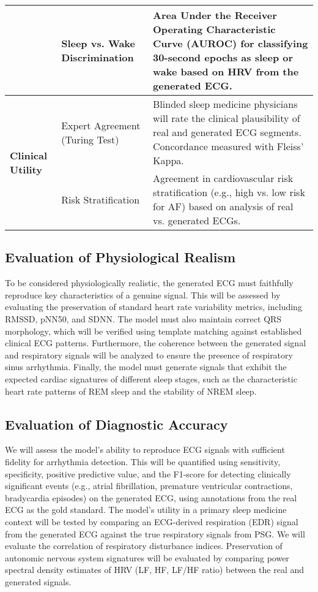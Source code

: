 \documentclass[11pt,en]{elegantpaper}
\begin{document}
\begin{table}[H]
\begin{tabular}{p{} p{} p{}}
        \cline{2-3}
        & Sleep vs. Wake Discrimination & Area Under the Receiver Operating Characteristic Curve (AUROC) for classifying 30-second epochs as sleep or wake based on HRV from the generated ECG. \\
        \midrule
        \multirow{2}{*}{\textbf{Clinical Utility}}
        & Expert Agreement (Turing Test) & Blinded sleep medicine physicians will rate the clinical plausibility of real and generated ECG segments. Concordance measured with Fleiss' Kappa. \\
        \cline{2-3}
        & Risk Stratification & Agreement in cardiovascular risk stratification (e.g., high vs. low risk for AF) based on analysis of real vs. generated ECGs. \\
        \bottomrule
    \end{tabular}
\end{table}

\subsection{Evaluation of Physiological Realism}
To be considered physiologically realistic, the generated ECG must faithfully reproduce key characteristics of a genuine signal. This will be assessed by evaluating the preservation of standard heart rate variability metrics, including RMSSD, pNN50, and SDNN. The model must also maintain correct QRS morphology, which will be verified using template matching against established clinical ECG patterns. Furthermore, the coherence between the generated signal and respiratory signals will be analyzed to ensure the presence of respiratory sinus arrhythmia. Finally, the model must generate signals that exhibit the expected cardiac signatures of different sleep stages, such as the characteristic heart rate patterns of REM sleep and the stability of NREM sleep.

\subsection{Evaluation of Diagnostic Accuracy}
We will assess the model's ability to reproduce ECG signals with sufficient fidelity for arrhythmia detection. This will be quantified using sensitivity, specificity, positive predictive value, and the F1-score for detecting clinically significant events (e.g., atrial fibrillation, premature ventricular contractions, bradycardia episodes) on the generated ECG, using annotations from the real ECG as the gold standard. The model's utility in a primary sleep medicine context will be tested by comparing an ECG-derived respiration (EDR) signal from the generated ECG against the true respiratory signals from PSG. We will evaluate the correlation of respiratory disturbance indices. Preservation of autonomic nervous system signatures will be evaluated by comparing power spectral density estimates of HRV (LF, HF, LF/HF ratio) between the real and generated signals.
\end{document}
